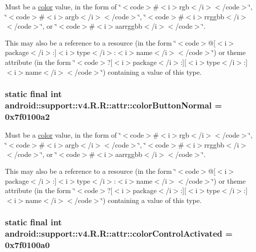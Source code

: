 Must be a \hyperlink{classandroid_1_1support_1_1v4_1_1_r_1_1color}{color} value, in the form of \char`\"{}$<$code$>$\#$<$i$>$rgb$<$/i$>$$<$/code$>$\char`\"{}, \char`\"{}$<$code$>$\#$<$i$>$argb$<$/i$>$$<$/code$>$\char`\"{}, \char`\"{}$<$code$>$\#$<$i$>$rrggbb$<$/i$>$$<$/code$>$\char`\"{}, or \char`\"{}$<$code$>$\#$<$i$>$aarrggbb$<$/i$>$$<$/code$>$\char`\"{}. 

This may also be a reference to a resource (in the form \char`\"{}$<$code$>$@\mbox{[}$<$i$>$package$<$/i$>$:\mbox{]}$<$i$>$type$<$/i$>$:$<$i$>$name$<$/i$>$$<$/code$>$\char`\"{}) or theme attribute (in the form \char`\"{}$<$code$>$?\mbox{[}$<$i$>$package$<$/i$>$:\mbox{]}\mbox{[}$<$i$>$type$<$/i$>$:\mbox{]}$<$i$>$name$<$/i$>$$<$/code$>$\char`\"{}) containing a value of this type. \hypertarget{classandroid_1_1support_1_1v4_1_1_r_1_1attr_719fb9c3202bbaacaea7285d8268a7aa}{
\subsubsection[{colorButtonNormal}]{\setlength{\rightskip}{0pt plus 5cm}static final int android::support::v4.R.R::attr::colorButtonNormal = 0x7f0100a2}}
\label{classandroid_1_1support_1_1v4_1_1_r_1_1attr_719fb9c3202bbaacaea7285d8268a7aa}


Must be a \hyperlink{classandroid_1_1support_1_1v4_1_1_r_1_1color}{color} value, in the form of \char`\"{}$<$code$>$\#$<$i$>$rgb$<$/i$>$$<$/code$>$\char`\"{}, \char`\"{}$<$code$>$\#$<$i$>$argb$<$/i$>$$<$/code$>$\char`\"{}, \char`\"{}$<$code$>$\#$<$i$>$rrggbb$<$/i$>$$<$/code$>$\char`\"{}, or \char`\"{}$<$code$>$\#$<$i$>$aarrggbb$<$/i$>$$<$/code$>$\char`\"{}. 

This may also be a reference to a resource (in the form \char`\"{}$<$code$>$@\mbox{[}$<$i$>$package$<$/i$>$:\mbox{]}$<$i$>$type$<$/i$>$:$<$i$>$name$<$/i$>$$<$/code$>$\char`\"{}) or theme attribute (in the form \char`\"{}$<$code$>$?\mbox{[}$<$i$>$package$<$/i$>$:\mbox{]}\mbox{[}$<$i$>$type$<$/i$>$:\mbox{]}$<$i$>$name$<$/i$>$$<$/code$>$\char`\"{}) containing a value of this type. \hypertarget{classandroid_1_1support_1_1v4_1_1_r_1_1attr_c7029205d377997043e1d5b55991b243}{
\subsubsection[{colorControlActivated}]{\setlength{\rightskip}{0pt plus 5cm}static final int android::support::v4.R.R::attr::colorControlActivated = 0x7f0100a0}}
\label{classandroid_1_1support_1_1v4_1_1_r_1_1attr_c7029205d377997043e1d5b55991b243}


